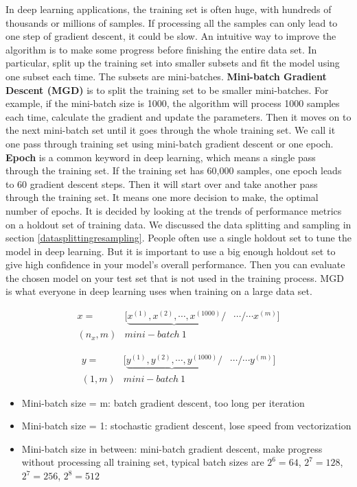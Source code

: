 \documentclass[
  12pt,
]{krantz}
\providecommand{\tightlist}{%
  \setlength{\itemsep}{0pt}\setlength{\parskip}{0pt}}
\begin{document}
In deep learning applications, the training set is often huge, with hundreds of thousands or millions of samples. If processing all the samples can only lead to one step of gradient descent, it could be slow. An intuitive way to improve the algorithm is to make some progress before finishing the entire data set. In particular, split up the training set into smaller subsets and fit the model using one subset each time. The subsets are mini-batches. \textbf{Mini-batch Gradient Descent (MGD)} is to split the training set to be smaller mini-batches. For example, if the mini-batch size is 1000, the algorithm will process 1000 samples each time, calculate the gradient and update the parameters. Then it moves on to the next mini-batch set until it goes through the whole training set. We call it one pass through training set using mini-batch gradient descent or one epoch. \textbf{Epoch} is a common keyword in deep learning, which means a single pass through the training set. If the training set has 60,000 samples, one epoch leads to 60 gradient descent steps. Then it will start over and take another pass through the training set. It means one more decision to make, the optimal number of epochs. It is decided by looking at the trends of performance metrics on a holdout set of training data. We discussed the data splitting and sampling in section \ref{datasplittingresampling}. People often use a single holdout set to tune the model in deep learning. But it is important to use a big enough holdout set to give high confidence in your model's overall performance. Then you can evaluate the chosen model on your test set that is not used in the training process. MGD is what everyone in deep learning uses when training on a large data set.

\[\begin{array}{ccc} x= & [\underbrace{x^{(1)},x^{(2)},\cdots,x^{(1000)}}/ & \cdots/\cdots x^{(m)}]\\ (n_{x},m) & mini-batch\ 1 \end{array}\]

\[\begin{array}{ccc} y= & [\underbrace{y^{(1)},y^{(2)},\cdots,y^{(1000)}}/ & \cdots/\cdots y^{(m)}]\\ (1,m) & mini-batch\ 1 \end{array}\]

\begin{itemize}
\tightlist
\item
  Mini-batch size = m: batch gradient descent, too long per iteration
\item
  Mini-batch size = 1: stochastic gradient descent, lose speed from vectorization
\item
  Mini-batch size in between: mini-batch gradient descent, make progress without processing all training set, typical batch sizes are \(2^6=64\), \(2^7=128\), \(2^7=256\), \(2^8=512\)
\end{itemize}
\end{document}
